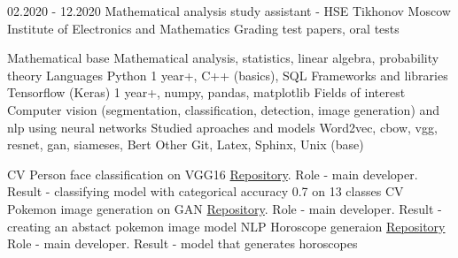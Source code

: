 \documentclass[9pt]{developercv} %
\begin{document}
	
	
	
	\begin{entrylist}
		\entry
		{02.2020 - 12.2020}
		{Mathematical analysis study assistant - HSE Tikhonov Moscow Institute of Electronics and Mathematics}
		{ }
		{Grading test papers, oral tests }
	\end{entrylist}
	
	
	\cvsect{Skills}
	
	\begin{entrylist}
		\entry
		{ }
		{Mathematical base}
		{ }
		{Mathematical analysis, statistics, linear algebra, probability theory    }
		\entry
		{ }
		{Languages }
		{ }
		{Python 1 year+, C++ (basics), SQL }
		\entry
		{ }
		{Frameworks and libraries}
		{ }
		{Tensorflow (Keras) 1 year+, numpy, pandas, matplotlib }
		\entry
		{ }
		{Fields of interest}
		{ }
		{Computer vision (segmentation, classification, detection, image generation) and  nlp using neural networks  }
		\entry
		{ }
		{Studied aproaches and models}
		{ }
		{Word2vec, cbow, vgg, resnet, gan, siameses, Bert    }
		\entry
		{ }
		{Other}
		{ }
		{Git, Latex, Sphinx, Unix (base) }
	\end{entrylist}

	\cvsect{Projects}
	
	\begin{entrylist}
		\entry
		{CV }
		{Person face classification on VGG16}
		{ }
		{\href{https://github.com/ArmageddonReloadedDK/face_net}{Repository}. Role - main developer. Result - classifying model with categorical accuracy 0.7 on 13 classes }
		\entry
		{CV}
		{Pokemon image generation on GAN}
		{}
		{\href{https://github.com/ArmageddonReloadedDK/piko_gan}{Repository}.  Role - main developer. Result - creating an abstact
		 pokemon image model }
		\entry
		{NLP}
		{Horoscope generaion}
		{ }
		{\href{https://github.com/ArmageddonReloadedDK/astro}{Repository} Role - main developer. Result - model that generates horoscopes  }
	
	\end{entrylist}
	
\end{document}
